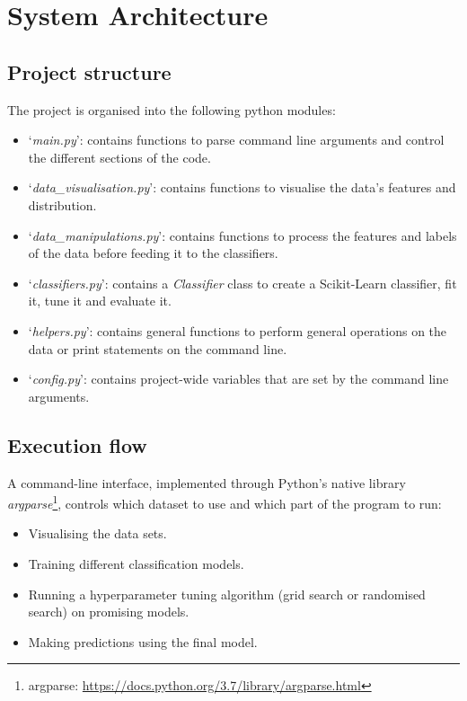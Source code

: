 \documentclass[letterpaper,12pt]{article}
\begin{document}

\section{System Architecture}
\label{sec:system-architecture}

\subsection{Project structure}

The project is organised into the following python modules:
\begin{itemize}
    \item `\textit{main.py}': contains functions to parse command line arguments and control the different sections of the code.
    \item `\textit{data\_visualisation.py}': contains functions to visualise the data's features and distribution.
    \item `\textit{data\_manipulations.py}': contains functions to process the features and labels of the data before feeding it to the classifiers.
    \item `\textit{classifiers.py}': contains a \textit{Classifier} class to create a Scikit-Learn classifier, fit it, tune it and evaluate it.
    \item `\textit{helpers.py}': contains general functions to perform general operations on the data or print statements on the command line.
    \item `\textit{config.py}': contains project-wide variables that are set by the command line arguments.
\end{itemize}

\subsection{Execution flow}

A command-line interface, implemented through Python’s native library \textit{argparse}\footnote{argparse: \url{https://docs.python.org/3.7/library/argparse.html}}, controls which dataset to use and which part of the program to run:
\begin{itemize}
    \item Visualising the data sets.
    \item Training different classification models.
    \item Running a hyperparameter tuning algorithm (grid search or randomised search) on promising models.
    \item Making predictions using the final model.
\end{itemize}
\end{document}
